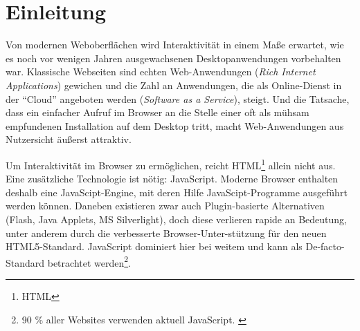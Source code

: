 \documentclass[a4paper, 12pt, hidelinks, listof=totoc, listoftables=totoc, bibliography=totoc]{scrreprt}
\begin{document}


\pagestyle{empty} %


%
%
%
%
%
%
%
%
%
%


\pagestyle{scrheadings} %




\tableofcontents

\newpage



\chapter{Einleitung}


Von modernen Weboberflächen wird Interaktivität in einem Maße erwartet, wie es noch vor wenigen Jahren ausgewachsenen Desktopanwendungen vorbehalten war. Klassische Webseiten sind echten Web-Anwendungen (\emph{Rich Internet Applications}) gewichen und die Zahl an Anwendungen, die als Online-Dienst in der "`Cloud"' angeboten werden (\emph{Software as a Service}), steigt. Und die Tatsache, dass ein einfacher Aufruf im Browser an die Stelle einer oft als mühsam empfundenen Installation auf dem Desktop tritt, macht Web-Anwendungen aus Nutzersicht äußerst attraktiv.


Um Interaktivität im Browser zu ermöglichen, reicht HTML\footnote{\ac{HTML}} allein nicht aus. Eine zusätzliche Technologie ist nötig: JavaScript. Moderne Browser enthalten deshalb eine JavaScipt-Engine, mit deren Hilfe JavaScipt-Programme ausgeführt werden können. Daneben existieren zwar auch Plugin-basierte Alternativen (Flash, Java Applets, MS Silverlight), doch diese verlieren rapide an Bedeutung, unter anderem durch die verbesserte Browser-Unter-stützung für den neuen HTML5-Standard. JavaScript dominiert hier bei weitem und kann als De-facto-Standard betrachtet werden\footnote{90 \% aller Websites verwenden aktuell JavaScript. \cite{w3techs.CLI}}.
\end{document}
